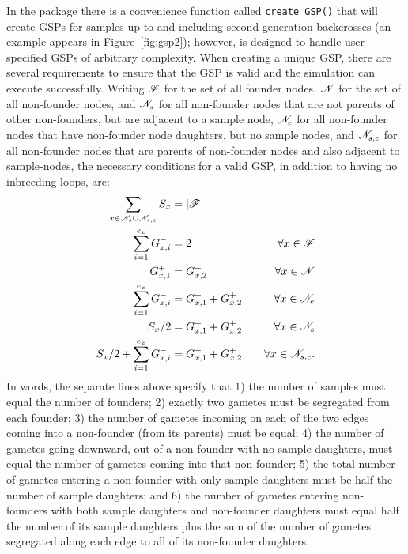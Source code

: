 In the \gscramble{} package there is a convenience function called {\footnotesize\tt create\_GSP()} that
will create GSPs for samples up to and including second-generation backcrosses (an example appears in Figure~\ref{fig:gsp2});
however, \gscramble{} is designed
to handle user-specified GSPs of arbitrary complexity.  When creating a unique GSP,
there are several requirements to ensure that the GSP is valid
and the simulation can execute successfully.
Writing $\mathscr{F}$ for the set of all founder nodes, $\mathscr{N}$ for the set of all non-founder nodes, and $\mathscr{N}_s$ for all non-founder
nodes that are not parents of other non-founders, but are adjacent to a sample node, $\mathscr{N}_e$ for all
non-founder nodes that have non-founder node daughters, but no sample nodes, and $\mathscr{N}_{s,e}$ for all
non-founder nodes that are parents of non-founder nodes and also adjacent to sample-nodes, the necessary conditions
for a valid GSP, in addition to having no inbreeding loops, are:
\begin{equation}
\begin{aligned}
\sum_{x \in \mathscr{N}_s \cup \mathscr{N}_{s,e}} S_x &= |\mathscr{F}| &  \\
\sum_{i=1}^{e_x} G^-_{x,i} &= 2 & \forall x \in \mathscr{F} \\
G^+_{x,1} &= G^+_{x,2} & \forall x \in \mathscr{N} \\
\sum_{i=1}^{e_x} G^-_{x,i} &= G^+_{x,1} +  G^+_{x,2} & \forall x \in \mathscr{N}_e  \\
 S_x/2  &= G^+_{x,1} +  G^+_{x,2} & ~~~\forall x \in \mathscr{N}_s \\
 S_x/2 + \sum_{i=1}^{e_x} G^-_{x,i} &= G^+_{x,1} +  G^+_{x,2} & ~~~\forall x \in \mathscr{N}_{s,e}.  \\
\end{aligned}
\end{equation}
In words, the separate lines above specify that 1) the number of samples
must equal the number of founders; 2) exactly two gametes must be
segregated from each founder; 3) the number of gametes incoming on each of the
two edges coming into a non-founder (from its parents) must be equal; 
4) the number of gametes going downward, out of a non-founder with no sample
daughters, must equal the number of gametes coming into that non-founder;
5)  the total number of gametes entering a non-founder with only sample daughters
must be half the number of sample daughters; and 6) the number of gametes
entering non-founders with both sample daughters and non-founder daughters must
equal half the number of its sample daughters plus the sum of the number of gametes segregated
along each edge to all of its non-founder daughters.

